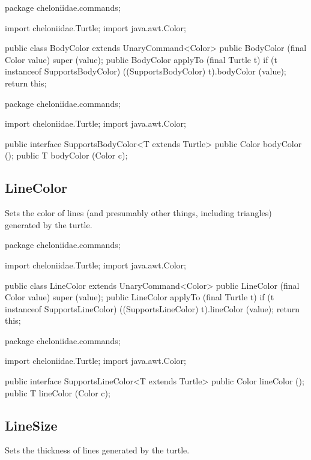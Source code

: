 \documentclass{report}
\begin{document}
\begin{javacode}
package cheloniidae.commands;

import cheloniidae.Turtle;
import java.awt.Color;

public class BodyColor extends UnaryCommand<Color> {
  public BodyColor (final Color value) {super (value);}
  public BodyColor applyTo (final Turtle t) {
    if (t instanceof SupportsBodyColor) ((SupportsBodyColor) t).bodyColor (value);
    return this;
  }
}
\end{javacode}

\begin{javacode}
package cheloniidae.commands;

import cheloniidae.Turtle;
import java.awt.Color;

public interface SupportsBodyColor<T extends Turtle> {
  public Color bodyColor ();
  public T     bodyColor (Color c);
}
\end{javacode}

\subsection {LineColor} \label{sec:linecolor}
        Sets the color of lines (and presumably other things, including triangles) generated by the turtle.

\begin{javacode}
package cheloniidae.commands;

import cheloniidae.Turtle;
import java.awt.Color;

public class LineColor extends UnaryCommand<Color> {
  public LineColor (final Color value) {super (value);}
  public LineColor applyTo (final Turtle t) {
    if (t instanceof SupportsLineColor) ((SupportsLineColor) t).lineColor (value);
    return this;
  }
}
\end{javacode}

\begin{javacode}
package cheloniidae.commands;

import cheloniidae.Turtle;
import java.awt.Color;

public interface SupportsLineColor<T extends Turtle> {
  public Color lineColor ();
  public T     lineColor (Color c);
}
\end{javacode}

\subsection {LineSize} \label{sec:linesize}
        Sets the thickness of lines generated by the turtle.
\end{document}
